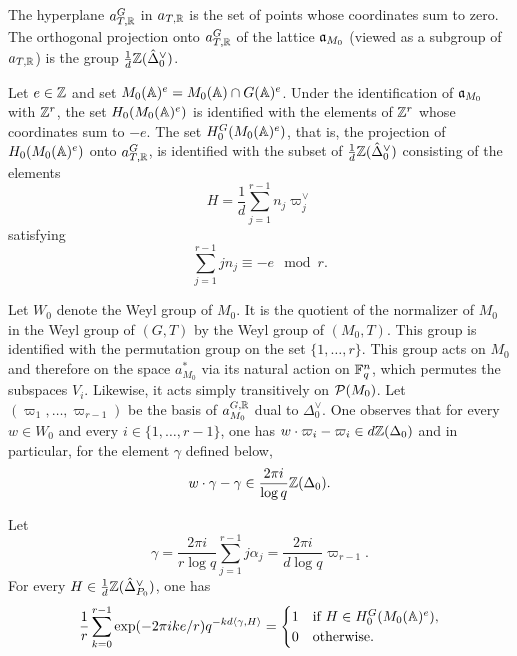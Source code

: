 \begin{paragr}
The hyperplane $a_{T,\mathbb{R}}^G$ in $a_{T,\mathbb{R}}$ is the set of points whose coordinates sum to zero. The orthogonal projection onto $a_{T,\mathbb{R}}^G$ of the lattice $\mathfrak{a}_{M_0}$ (viewed as a subgroup of $a_{T,\mathbb{R}}$) is the group $\frac{1}{d} \mathbb{Z}(\hat{\Delta}_0^\vee)$.

Let $e\in \mathbb{Z}$ and set $M_0(\mathbb{A})^e=M_0(\mathbb{A})\cap G(\mathbb{A})^e$. Under the identification of $\mathfrak{a}_{M_0}$ with $\mathbb{Z}^r$, the set $H_0(M_0(\mathbb{A})^e)$ is identified with the elements of $\mathbb{Z}^r$ whose coordinates sum to $-e$. The set $H_0^G(M_0(\mathbb{A})^e)$, that is, the projection of $H_0(M_0(\mathbb{A})^e)$ onto $a_{T,\mathbb{R}}^G$, is identified with the subset of $\frac{1}{d}\mathbb{Z}(\hat{\Delta}_0^\vee)$ consisting of the elements
$$H=\frac1d \sum_{j=1}^{r-1} n_j \varpi_j^\vee$$
satisfying
$$\sum_{j=1}^{r-1} j n_j \equiv -e \mod r.$$

Let $W_0$ denote the Weyl group of $M_0$. It is the quotient of the normalizer of $M_0$ in the Weyl group of $(G,T)$ by the Weyl group of $(M_0,T)$. This group is identified with the permutation group on the set $\{1,\ldots,r\}$. This group acts on $M_0$ and therefore on the space $a_{M_0}^*$ via its natural action on $\mathbb{F}_q^n$, which permutes the subspaces $V_i$. Likewise, it acts simply transitively on $\mathcal{P}(M_0)$. Let $(\varpi_1,\ldots,\varpi_{r-1})$ be the basis of $a_{M_0}^{G,\mathbb{R}}$ dual to $\Delta_0^\vee$. One observes that for every $w\in W_0$ and every $i\in \{1,\ldots,r-1\}$, one has  $w\cdot \varpi_{i}-\varpi_{i}\in d\mathbb{Z}(\Delta_0)$ and in particular, for the element $\gamma$ defined below,
\begin{equation}
  \label{eq:invariance-W0}
 w\cdot \gamma-\gamma \in \frac{2\pi i }{\log q }\mathbb{Z}(\Delta_0).
\end{equation}

\begin{lemme}\label{lem:orthog-e}
Let
\begin{equation}
  \label{eq:defgamma}
  \gamma=\frac{2\pi i }{r \log q }  \sum_{j=1}^{r-1}j \alpha_j= \frac{2\pi i }{d \log q }    \varpi_{r-1}.
\end{equation}
For every $H\in \frac{1}{d}\mathbb{Z}(\hat{\Delta}_{P_0}^\vee)$, one has
\begin{equation}
  \label{eq:orthog-e}
  \frac1r \sum_{k=0}^{r-1}   \exp(-2\pi i k e/r)  q^{-kd  \langle \gamma , H \rangle }= \begin{cases} 1 & \text{if }   H \in H_0^G(M_0(\mathbb{A})^e), \\ 0 & \text{otherwise.} \end{cases}
\end{equation}
\end{lemme}
\end{paragr}

